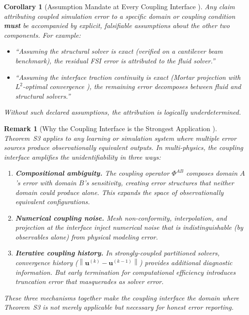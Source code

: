 \documentclass[11pt,a4paper]{article}
\newtheorem{corollary}[theorem]{Corollary}
\newtheorem{remark}[theorem]{Remark}
\theoremstyle{definition}
\newcommand{\norm}[1]{\left\lVert#1\right\rVert}
\newcommand{\ThmSCXHonest}{Theorem~S3}
\begin{document}
\begin{corollary}[Assumption Mandate at Every Coupling Interface ]\label{cor:assumption_mandate}
Any claim attributing coupled simulation error to a specific domain or coupling condition \textbf{must} be accompanied by explicit, falsifiable assumptions about the other two components. For example:
\begin{itemize}
    \item ``Assuming the structural solver is exact (verified on a cantilever beam benchmark), the residual FSI error is attributed to the fluid solver.''
    \item ``Assuming the interface traction continuity is exact (Mortar projection with $L^2$-optimal convergence \cite{Wohlmuth2001}), the remaining error decomposes between fluid and structural solvers.''
\end{itemize}
Without such declared assumptions, the attribution is logically underdetermined.
\end{corollary}

\begin{remark}[Why the Coupling Interface is the Strongest Application ]\label{rem:strongest}
\ThmSCXHonest{} applies to any learning or simulation system where multiple error sources produce observationally equivalent outputs. In multi-physics, the coupling interface amplifies the unidentifiability in three ways:
\begin{enumerate}[label=(\roman*)]
    \item \textbf{Compositional ambiguity.} The coupling operator $\Phi^{AB}$ composes domain $A$'s error with domain $B$'s sensitivity, creating error structures that neither domain could produce alone. This expands the space of observationally equivalent configurations.
    \item \textbf{Numerical coupling noise.} Mesh non-conformity, interpolation, and projection at the interface inject numerical noise that is indistinguishable (by observables alone) from physical modeling error.
    \item \textbf{Iterative coupling history.} In strongly-coupled partitioned solvers, convergence history ($\norm{\mathbf{u}^{(k)} - \mathbf{u}^{(k-1)}}$) provides additional diagnostic information. But early termination for computational efficiency introduces truncation error that masquerades as solver error.
\end{enumerate}
These three mechanisms together make the coupling interface the domain where \ThmSCXHonest{} is not merely applicable but \textit{necessary} for honest error reporting.
\end{remark}
\end{document}

